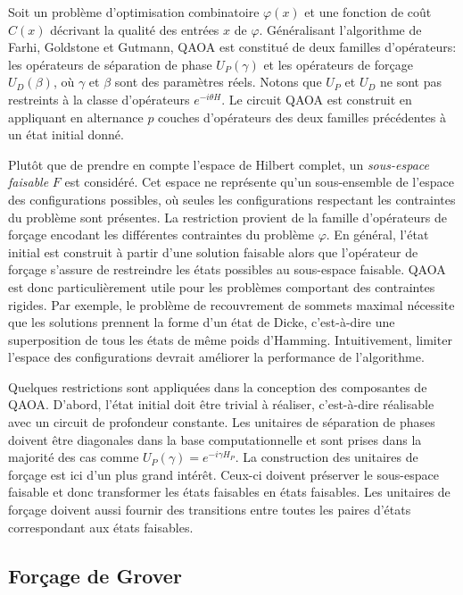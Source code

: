 Soit un problème d'optimisation combinatoire $\varphi(x)$ et une fonction de coût $C(x)$ décrivant la qualité des entrées $x$ de $\varphi$. Généralisant l'algorithme de Farhi, Goldstone et Gutmann, QAOA est constitué de deux familles d'opérateurs: les opérateurs de séparation de phase $U_{P}(\gamma)$ et les opérateurs de forçage $U_{D}(\beta)$, où $\gamma$ et $\beta$ sont des paramètres réels. Notons que $U_{P}$ et $U_{D}$ ne sont pas restreints à la classe d'opérateurs $e^{-i \theta H}$. Le circuit QAOA est construit en appliquant en alternance $p$ couches d'opérateurs des deux familles précédentes à un état initial donné.
        
Plutôt que de prendre en compte l'espace de Hilbert complet, un \textit{sous-espace faisable} $F$ est considéré. Cet espace ne représente qu'un sous-ensemble de l'espace des configurations possibles, où seules les configurations respectant les contraintes du problème sont présentes. La restriction provient de la famille d'opérateurs de forçage encodant les différentes contraintes du problème $\varphi$. En général, l'état initial est construit à partir d'une solution faisable alors que l'opérateur de forçage s'assure de restreindre les états possibles au sous-espace faisable. QAOA est donc particulièrement utile pour les problèmes comportant des contraintes rigides. Par exemple, le problème de recouvrement de sommets maximal nécessite que les solutions prennent la forme d'un état de Dicke, c'est-à-dire une superposition de tous les états de même poids d'Hamming. Intuitivement, limiter l'espace des configurations devrait améliorer la performance de l'algorithme. 

Quelques restrictions sont appliquées dans la conception des composantes de QAOA. D'abord, l'état initial doit être trivial à réaliser, c'est-à-dire réalisable avec un circuit de profondeur constante. Les unitaires de séparation de phases doivent être diagonales dans la base computationnelle et sont prises dans la majorité des cas comme $U_{P}(\gamma) = e^{-i \gamma H_{P}}$. La construction des unitaires de forçage est ici d'un plus grand intérêt. Ceux-ci doivent préserver le sous-espace faisable et donc transformer les états faisables en états faisables. Les unitaires de forçage doivent aussi fournir des transitions entre toutes les paires d'états correspondant aux états faisables.


\subsection{Forçage de Grover}
\label{subsec:forcage-de-grover}

